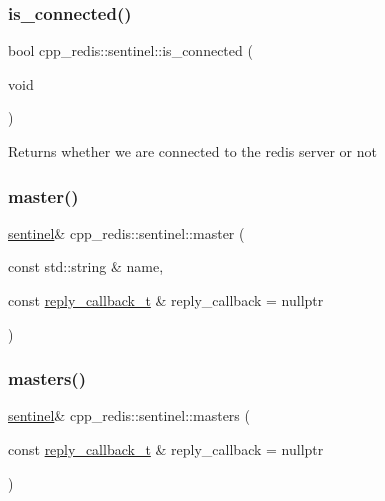\subsubsection{\texorpdfstring{is\+\_\+connected()}{is\_connected()}}
{\footnotesize\ttfamily bool cpp\+\_\+redis\+::sentinel\+::is\+\_\+connected (\begin{DoxyParamCaption}\item[{void}]{ }\end{DoxyParamCaption})}

\begin{DoxyReturn}{Returns}
whether we are connected to the redis server or not 
\end{DoxyReturn}
\mbox{\label{classcpp__redis_1_1sentinel_a3d08fbc6ae90b93613f0b3c56a6bf1fe}} 
\subsubsection{\texorpdfstring{master()}{master()}}
{\footnotesize\ttfamily \hyperlink{classcpp__redis_1_1sentinel}{sentinel}\& cpp\+\_\+redis\+::sentinel\+::master (\begin{DoxyParamCaption}\item[{const std\+::string \&}]{name,  }\item[{const \hyperlink{classcpp__redis_1_1sentinel_ae1a150ff8787208c47414397a061c9a7}{reply\+\_\+callback\+\_\+t} \&}]{reply\+\_\+callback = {\ttfamily nullptr} }\end{DoxyParamCaption})}

\mbox{\label{classcpp__redis_1_1sentinel_aed4cacf43432630eb2934ce8b8dec104}} 
\subsubsection{\texorpdfstring{masters()}{masters()}}
{\footnotesize\ttfamily \hyperlink{classcpp__redis_1_1sentinel}{sentinel}\& cpp\+\_\+redis\+::sentinel\+::masters (\begin{DoxyParamCaption}\item[{const \hyperlink{classcpp__redis_1_1sentinel_ae1a150ff8787208c47414397a061c9a7}{reply\+\_\+callback\+\_\+t} \&}]{reply\+\_\+callback = {\ttfamily nullptr} }\end{DoxyParamCaption})}


